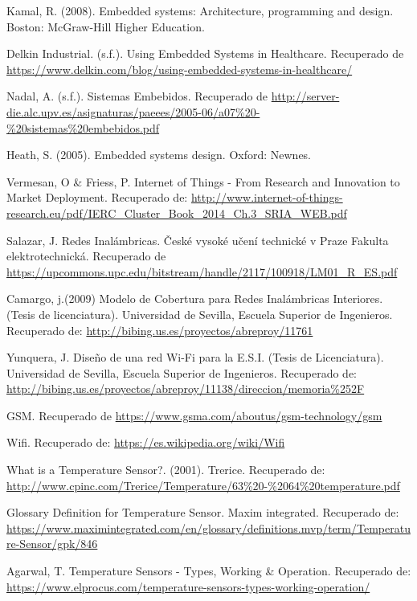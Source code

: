 \begin{thebibliography}{0}
	 Kamal, R. (2008). Embedded systems: Architecture, programming and design. Boston: McGraw-Hill Higher Education.
	
	 Delkin Industrial. (s.f.). Using Embedded Systems in Healthcare. Recuperado de  \url{https://www.delkin.com/blog/using-embedded-systems-in-healthcare/}
	
	 Nadal, A. (s.f.). Sistemas Embebidos. Recuperado de  \url{http://server-die.alc.upv.es/asignaturas/paeees/2005-06/a07%20-%20sistemas%20embebidos.pdf}
	
	 Heath, S. (2005). Embedded systems design. Oxford: Newnes.
	
	 Vermesan, O \& Friess, P. Internet of Things - From Research and Innovation to Market Deployment. Recuperado de:  \url{http://www.internet-of-things-research.eu/pdf/IERC_Cluster_Book_2014_Ch.3_SRIA_WEB.pdf}
	
	 Salazar, J. Redes Inalámbricas. České vysoké učení technické v Praze Fakulta elektrotechnická. Recuperado de \url{https://upcommons.upc.edu/bitstream/handle/2117/100918/LM01_R_ES.pdf}
	
	 Camargo, j.(2009) Modelo de Cobertura para Redes Inalámbricas Interiores. (Tesis de licenciatura). Universidad de Sevilla, Escuela Superior de Ingenieros. Recuperado de: \url{http://bibing.us.es/proyectos/abreproy/11761}
	
	 Yunquera, J. Diseño de una red Wi-Fi para la E.S.I. (Tesis de Licenciatura). Universidad de Sevilla, Escuela Superior de Ingenieros. Recuperado de: \url{http://bibing.us.es/proyectos/abreproy/11138/direccion/memoria%252F}
	
	 GSM. Recuperado de \url{https://www.gsma.com/aboutus/gsm-technology/gsm}
	
	 Wifi. Recuperado de: \url{https://es.wikipedia.org/wiki/Wifi}
	
	
	 What is a Temperature Sensor?. (2001). Trerice. Recuperado de: \url{http://www.cpinc.com/Trerice/Temperature/63%20-%2064%20temperature.pdf}
	
	 Glossary Definition for Temperature Sensor. Maxim integrated. Recuperado de: \url{https://www.maximintegrated.com/en/glossary/definitions.mvp/term/Temperature-Sensor/gpk/846}
	
	 Agarwal, T.  Temperature Sensors - Types, Working \& Operation. Recuperado de: \url{https://www.elprocus.com/temperature-sensors-types-working-operation/}
	

\end{thebibliography}
